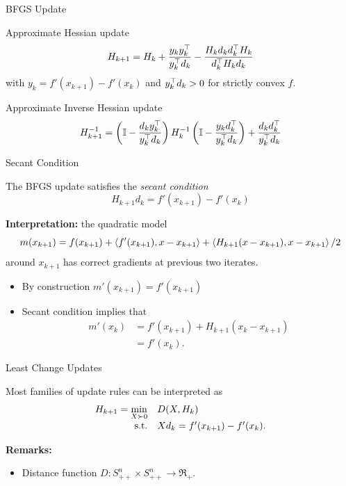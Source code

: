 \documentclass[9pt]{beamer}
\begin{document}
\begin{frame}{BFGS Update}

  Approximate Hessian update
  \[
    H_{k+1} = H_k + \frac{y_k y_k^\top}{y_k^\top d_k} - \frac{H_k d_k d_k^\top H_k}{d_k^\top H_k d_k} 
  \]
  with $y_k = f'(x_{k+1})-f'(x_k)$ and $y_k^\top d_k>0$ for strictly convex $f$.

  \vfill

  Approximate Inverse Hessian update
  \[
    H^{-1}_{k+1} = \left(\mathbb I - \frac{d_ky_k^\top}{y_k^\top d_k}\right) H^{-1}_k \left(\mathbb I - \frac{y_k d_k^\top}{y_k^\top d_k}\right) + \frac{d_k d_k^\top}{y_k^\top d_k} 
  \]
\end{frame}

\begin{frame}{Secant Condition}

  The BFGS update satisfies the \emph{secant condition}
  \[
    H_{k+1} d_k = f'(x_{k+1})-f'(x_k)
  \]

  \vfill
  
  \textbf{Interpretation:} the quadratic model
  \[
    m(x_{k+1}) = f(x_{k+1}) + \left<f'(x_{k+1}), x-x_{k+1}\right> + \left<H_{k+1}(x-x_{k+1}), x-x_{k+1}\right>/2
  \]
  around $x_{k+1}$ has correct gradients at previous two iterates.

  \vfill
  
  \begin{itemize}
  \item By construction $m'(x_{k+1}) = f'(x_{k+1})$
  \item Secant condition implies that
    \begin{align*}
      m'(x_k) & = f'(x_{k+1})+H_{k+1}(x_k-x_{k+1}) \\[0.5em]
              & = f'(x_k).
    \end{align*}
  \end{itemize}
  
\end{frame}

\begin{frame}{Least Change Updates}

  Most families of update rules can be interpreted as
  \[
    \begin{array}{rl}
      H_{k+1} = {\displaystyle \min_{X\succ 0}} & D(X, H_k) \\[0.5em]
      \mathrm{s.t.} & X d_k = f'(x_{k+1})-f'(x_k).
    \end{array}
  \]

  \vfill
  \textbf{Remarks:}
  \begin{itemize}
  \item Distance function $D:S_{++}^n\times S^{n}_{++}\to \Re_+$.
  \end{itemize}

\end{frame}
\end{document}
